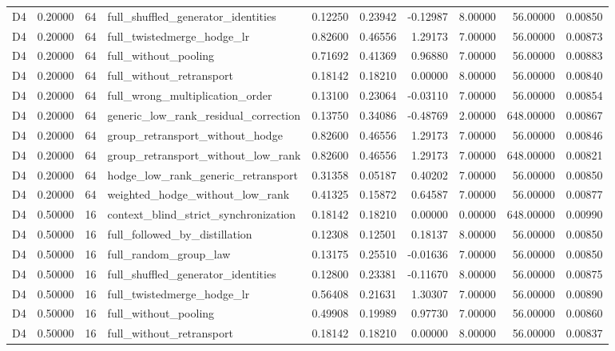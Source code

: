 \begin{tabular}{lrrlrrrrrr}
D4 & 0.20000 & 64 & full_shuffled_generator_identities & 0.12250 & 0.23942 & -0.12987 & 8.00000 & 56.00000 & 0.00850 \\
D4 & 0.20000 & 64 & full_twistedmerge_hodge_lr & 0.82600 & 0.46556 & 1.29173 & 7.00000 & 56.00000 & 0.00873 \\
D4 & 0.20000 & 64 & full_without_pooling & 0.71692 & 0.41369 & 0.96880 & 7.00000 & 56.00000 & 0.00883 \\
D4 & 0.20000 & 64 & full_without_retransport & 0.18142 & 0.18210 & 0.00000 & 8.00000 & 56.00000 & 0.00840 \\
D4 & 0.20000 & 64 & full_wrong_multiplication_order & 0.13100 & 0.23064 & -0.03110 & 7.00000 & 56.00000 & 0.00854 \\
D4 & 0.20000 & 64 & generic_low_rank_residual_correction & 0.13750 & 0.34086 & -0.48769 & 2.00000 & 648.00000 & 0.00867 \\
D4 & 0.20000 & 64 & group_retransport_without_hodge & 0.82600 & 0.46556 & 1.29173 & 7.00000 & 56.00000 & 0.00846 \\
D4 & 0.20000 & 64 & group_retransport_without_low_rank & 0.82600 & 0.46556 & 1.29173 & 7.00000 & 648.00000 & 0.00821 \\
D4 & 0.20000 & 64 & hodge_low_rank_generic_retransport & 0.31358 & 0.05187 & 0.40202 & 7.00000 & 56.00000 & 0.00850 \\
D4 & 0.20000 & 64 & weighted_hodge_without_low_rank & 0.41325 & 0.15872 & 0.64587 & 7.00000 & 56.00000 & 0.00877 \\
D4 & 0.50000 & 16 & context_blind_strict_synchronization & 0.18142 & 0.18210 & 0.00000 & 0.00000 & 648.00000 & 0.00990 \\
D4 & 0.50000 & 16 & full_followed_by_distillation & 0.12308 & 0.12501 & 0.18137 & 8.00000 & 56.00000 & 0.00850 \\
D4 & 0.50000 & 16 & full_random_group_law & 0.13175 & 0.25510 & -0.01636 & 7.00000 & 56.00000 & 0.00850 \\
D4 & 0.50000 & 16 & full_shuffled_generator_identities & 0.12800 & 0.23381 & -0.11670 & 8.00000 & 56.00000 & 0.00875 \\
D4 & 0.50000 & 16 & full_twistedmerge_hodge_lr & 0.56408 & 0.21631 & 1.30307 & 7.00000 & 56.00000 & 0.00890 \\
D4 & 0.50000 & 16 & full_without_pooling & 0.49908 & 0.19989 & 0.97730 & 7.00000 & 56.00000 & 0.00860 \\
D4 & 0.50000 & 16 & full_without_retransport & 0.18142 & 0.18210 & 0.00000 & 8.00000 & 56.00000 & 0.00837 \\

\end{tabular}
